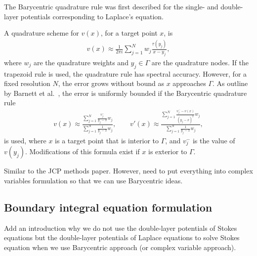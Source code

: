 \documentclass[preprint, 10pt]{elsarticle}
\begin{document}
The Barycentric quadrature rule was first described for the single- and
double-layer potentials corresponding to Laplace's equation.  



A quadrature scheme for $v(x)$, for a target point $x$, is
\begin{align}
  v(x) \approx \frac{1}{2\pi i} \sum_{j=1}^N 
    w_j \frac{\tau(y_j)}{x - y_j},
\end{align}
where $w_j$ are the quadrature weights and $y_j \in \Gamma$ are the
quadrature nodes.  If the trapezoid rule is used, the quadrature rule
has spectral accuracy.  However, for a fixed resolution $N$, the error
grows without bound as $x$ approaches $\Gamma$.  As outline by Barnett
et al.~\cite{bar-wu-vee2015}, the error is uniformly bounded if the
Barycentric quadrature rule
\begin{align}
  v(x) \approx \frac{\sum_{j=1}^N \frac{v_j^-}{y_j-x}w_j}
    {\sum_{j=1}^N \frac{1}{y_j-x}w_j},  \qquad
  v'(x) \approx \frac{\sum_{j=1}^N \frac{v_j^- - v(x)}{(y_j - x)^2}w_j}
    {\sum_{j=1}^N \frac{1}{y_j-x}w_j}, 
\end{align}
is used, where $x$ is a target point that is interior to $\Gamma$,
and $v_j^-$ is the value of $v(y_j)$.  Modifications of this formula
exist if $x$ is exterior to $\Gamma$.


Similar to the JCP methods paper.  However, need to put everything into
complex variables formulation so that we can use Barycentric ideas.


\subsection{Boundary integral equation formulation} 
\label{sec:bies}
Add an introduction why we do not use the double-layer potentials of Stokes equations but the double-layer potentials of Laplace equations to solve Stokes equation when we use Barycentric approach (or complex variable approach).
\end{document}
